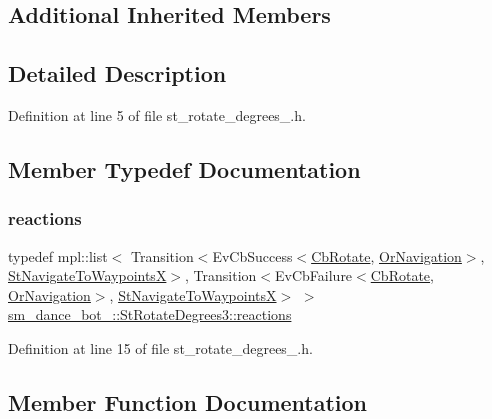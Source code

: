 \subsection*{Additional Inherited Members}


\subsection{Detailed Description}


Definition at line 5 of file st\+\_\+rotate\+\_\+degrees\+\_.\+h.



\subsection{Member Typedef Documentation}
\mbox{\label{structsm__dance__bot__2_1_1StRotateDegrees3_a3303bfde484081a5fdf1887114bdc6e9}} 
\subsubsection{\texorpdfstring{reactions}{reactions}}
{\footnotesize\ttfamily typedef mpl\+::list$<$ Transition$<$Ev\+Cb\+Success$<$\hyperlink{classcl__move__base__z_1_1CbRotate}{Cb\+Rotate}, \hyperlink{classsm__dance__bot__2_1_1OrNavigation}{Or\+Navigation}$>$, \hyperlink{structsm__dance__bot__2_1_1StNavigateToWaypointsX}{St\+Navigate\+To\+WaypointsX}$>$, Transition$<$Ev\+Cb\+Failure$<$\hyperlink{classcl__move__base__z_1_1CbRotate}{Cb\+Rotate}, \hyperlink{classsm__dance__bot__2_1_1OrNavigation}{Or\+Navigation}$>$, \hyperlink{structsm__dance__bot__2_1_1StNavigateToWaypointsX}{St\+Navigate\+To\+WaypointsX}$>$ $>$ \hyperlink{structsm__dance__bot__2_1_1StRotateDegrees3_a3303bfde484081a5fdf1887114bdc6e9}{sm\+\_\+dance\+\_\+bot\+\_\+::\+St\+Rotate\+Degrees3\+::reactions}}



Definition at line 15 of file st\+\_\+rotate\+\_\+degrees\+\_.\+h.



\subsection{Member Function Documentation}
\mbox{\label{structsm__dance__bot__2_1_1StRotateDegrees3_a9d399bede58a43d648f230e5c61f0f32}} 
